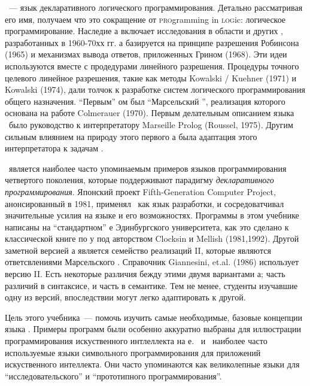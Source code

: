 
\prolog\ --- язык декларативного логического программирования. Детально
рассматривая его имя, получаем что это сокращение от \textsc{pro}gramming in
\textsc{log}ic: логическое программирование. Наследие \prolog а включает
исследования в области  и других
, разработанных в 1960-70хх гг. 
\prolog а базируется на принципе разрешения Робинсона (1965) и механизмах вывода
ответов, приложенных Грином (1968). Эти идеи используются вместе с продедурами
линейного разрешения. Процедуры точного целевого линейное разрешения, такие как
методы Kowalski / Kuehner (1971) и Kowalski (1974), дали толчок к разработке
систем логического программирования общего назначения. ``Первым'' \prolog ом был
``Марсельский \prolog'', реализация которого основана на работе Colmerauer
(1970). Первым делательным описанием языка \prolog\ было руководство к
интерпретатору Marseille Prolog (Roussel, 1975). Другим сильным влиянием на
природу этого первого \prolog а была адаптация этого интерпретатора к задачам
.

\prolog\ является наиболее часто упоминаемым примеров языков программирования
четвертого поколения, которые поддерживают парадигму \emph{декларативного
программирования}. Японский проект Fifth-Generation Computer
Project, анонсированный в 1981,
применял \prolog\ как язык разработки, и сосредоватчивал значительные усилия на
языке и его возможностях. Программы в этом учебнике написаны на ``стандартном''
\prolog е Эдинбургского университета, как
это сделано к классической книге по \prolog у под авторством Clocksin и Mellish
(1981,1992). Другой заметной версией \prolog а является семейство реализаций
\prolog II, которые являются ответсвлениями Марсельского . Справочник
Giannesini, et.al. (1986) использует версию \prolog II. Есть некоторые различия
бежду этими двумя вариантами \prolog а; часть различий в синтаксисе, и часть в
семантике. Тем не менее, студенты изучавшие одну из версий, впоследствии могут
легко адаптировать к другой.

Цель этого учебника\ --- помочь изучить самые необходимые, базовые концепции
языка \prolog. Примеры программ были особенно аккуратно выбраны для иллюстрации
программирования искуственного интлеллекта на \prolog е. \lisp\ и \prolog\
наиболее часто используемые языки символьного программирования для приложений
искуственного интеллекта. Они часто упоминаются как великолепные языки для
``исследовательского'' и ``прототипного программирования''.


